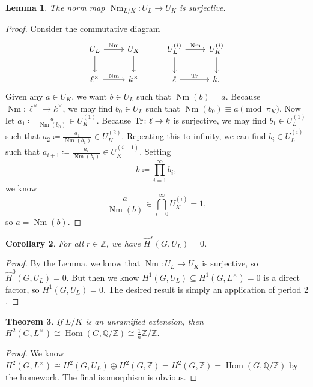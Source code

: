 \documentclass[leqno, openany]{memoir}
\newtheorem{thm}{Theorem}[section]
\newtheorem{cor}[thm]{Corollary}
\newtheorem{lem}[thm]{Lemma}
\theoremstyle{definition}
\theoremstyle{remark}
\theoremstyle{plain}
\theoremstyle{definition}
\theoremstyle{remark}
\newcommand{\Z}{\mathbb{Z}}
\newcommand{\Q}{\mathbb{Q}}
\newcommand{\wh}[1]{\widehat{#1}}
\DeclareMathOperator{\Hom}{Hom}
\DeclareMathOperator{\Nm}{Nm}
\begin{document}
\begin{lem} The norm map $\Nm_{L/K} \colon U_L \to U_K$ is surjective.
\end{lem}

\begin{proof} Consider the commutative diagram \begin{equation*} \begin{tikzcd}
U_L \ar{r}{\Nm} \ar{d} & U_K \ar{d} & U_L^{(i)} \ar{r}{\Nm} \ar{d} & U_K^{(i)}
\ar{d} \\ \ell^{\times} \ar{r}{\Nm} & k^{\times} & \ell \ar{r}{\Tr} & k.
\end{tikzcd} \end{equation*} Given any $a \in U_K$, we want $b \in U_L$ such
that $\Nm(b) = a$. Because $\Nm \colon \ell^{\times} \to k^{\times}$, we may
find $b_0 \in U_L$ such that $\Nm(b_0) \equiv a \pmod {\pi_K}$. Now let $a_1
\coloneqq \frac{a}{\Nm(b_0)} \in U_K^{(1)}$. Because $\Tr \colon \ell \to k$ is
surjective, we may find $b_1 \in U_L^{(1)}$ such that $a_2 \coloneqq
\frac{a_1}{\Nm(b_1)} \in U_K^{(2)}$. Repeating this to infinity, we can find
$b_i \in U_L^{(i)}$ such that $a_{i+1} \coloneqq \frac{a_i}{\Nm(b_i)} \in
U_K^{(i+1)}$. Setting \[ b \coloneqq \prod_{i=1}^{\infty} b_i, \] we know \[
\frac{a}{\Nm(b)} \in \bigcap_{i=0}^{\infty}U_K^{(i)} = \qty{1}, \] so $a =
\Nm(b)$.  \end{proof}

\begin{cor} For all $r \in \Z$, we have $\wh{H}^r(G, U_L) = 0$.  \end{cor}

\begin{proof} By the Lemma, we know that $\Nm \colon U_L \to U_K$ is
    surjective, so $\wh{H}^0(G, U_L) = 0$. But then we know $H^1(G, U_L)
    \subseteq H^1(G, L^{\times}) = 0$ is a direct factor, so $H^1(G, U_L) = 0$.
    The desired result is simply an application of period $2$.  \end{proof}

\begin{thm} If $L/K$ is an unramified extension, then $H^2(G, L^{\times}) \cong
\Hom(G, \Q/\Z) \cong \frac{1}{n} \Z / \Z$.  \end{thm}

\begin{proof} We know $H^2(G, L^{\times}) \cong H^2(G, U_L) \oplus H^2(G, \Z) =
H^2(G, \Z) = \Hom(G, \Q/\Z)$ by the homework. The final isomorphism is obvious.
\end{proof}
\end{document}
